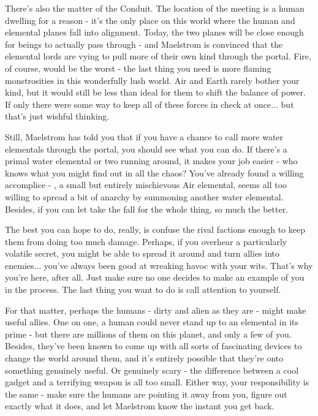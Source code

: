 \documentclass[char]{elementals}
\begin{document}
There’s also the matter of the Conduit. The location of the meeting is a human dwelling for a reason - it’s the only place on this world where the human and elemental planes fall into alignment. Today, the two planes will be close enough for beings to actually pass through - and Maelstrom is convinced that the elemental lords are vying to pull more of their own kind through the portal. Fire, of course, would be the worst - the last thing you need is more flaming monstrosities in this wonderfully lush world. Air and Earth rarely bother your kind, but it would still be less than ideal for them to shift the balance of power. If only there were some way to keep all of these forces in check at once... but that’s just wishful thinking. 

Still, Maelstrom has told you that if you have a chance to call more water elementals through the portal, you should see what you can do. If there’s a primal water elemental or two running around, it makes your job easier - who knows what you might find out in all the chaos? You’ve already found a willing accomplice - \cMiniAir{\intro}, a small but entirely mischievous Air elemental, seems all too willing to spread a bit of anarchy by summoning another water elemental. Besides, if you can let \cMiniAir{\them} take the fall for the whole thing, so much the better.

The best you can hope to do, really, is confuse the rival factions enough to keep them from doing too much damage. Perhaps, if you overhear a particularly volatile secret, you might be able to spread it around and turn allies into enemies... you’ve always been good at wreaking havoc with your wits. That’s why you’re here, after all. Just make sure no one decides to make an example of you in the process. The last thing you want to do is call attention to yourself.

For that matter, perhaps the humans - dirty and alien as they are - might make useful allies. One on one, a human could never stand up to an elemental in its prime - but there are millions of them on this planet, and only a few of you. Besides, they’ve been known to come up with all sorts of fascinating devices to change the world around them, and it’s entirely possible that they’re onto something genuinely useful. Or genuinely scary - the difference between a cool gadget and a terrifying weapon is all too small. Either way, your responsibility is the same - make sure the humans are pointing it away from you, figure out exactly what it does, and let Maelstrom know the instant you get back.
\end{document}
